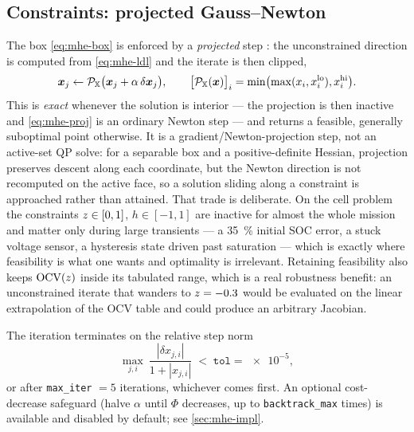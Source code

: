 \subsection{Constraints: projected Gauss--Newton}
The box \cref{eq:mhe-box} is enforced by a \emph{projected} step \citep{bertsekas1982projnewton}:
the unconstrained direction is computed from \cref{eq:mhe-ldl} and the iterate is then clipped,
\begin{equation}\label{eq:mhe-proj}
\bm{x}_j \leftarrow \mathcal{P}_{\mathbb{X}}\bigl(\bm{x}_j + \alpha\,\delta\bm{x}_j\bigr),
\qquad
\bigl[\mathcal{P}_{\mathbb{X}}(\bm{x})\bigr]_i = \min\bigl(\max(x_i, x^{\mathrm{lo}}_i), x^{\mathrm{hi}}_i\bigr).
\end{equation}
This is \emph{exact} whenever the solution is interior --- the projection is then inactive and
\cref{eq:mhe-proj} is an ordinary Newton step --- and returns a feasible, generally suboptimal point
otherwise.  It is a gradient/Newton-projection step, not an active-set QP solve: for a separable
box and a positive-definite Hessian, projection preserves descent along each coordinate, but the
Newton direction is not recomputed on the active face, so a solution sliding along a constraint is
approached rather than attained.  That trade is deliberate.  On the cell problem the constraints
$z\in[0,1]$, $h\in[-1,1]$ are inactive for almost the whole mission and matter only during large
transients --- a \SI{35}{\percent} initial SOC error, a stuck voltage sensor, a hysteresis state
driven past saturation --- which is exactly where feasibility is what one wants and optimality is
irrelevant.  Retaining feasibility also keeps $\mathrm{OCV}(z)$ inside its tabulated range, which is a
real robustness benefit: an unconstrained iterate that wanders to $z = -0.3$ would be evaluated
on the linear extrapolation of the OCV table and could produce an arbitrary Jacobian.

The iteration terminates on the relative step norm
\begin{equation}\label{eq:mhe-tol}
\max_{j,i}\ \frac{|\delta x_{j,i}|}{1+|x_{j,i}|} \;<\; \texttt{tol} = \num{e-5},
\end{equation}
or after \texttt{max\_iter} $= 5$ iterations, whichever comes first.  An optional cost-decrease
safeguard (halve $\alpha$ until $\Phi$ decreases, up to \texttt{backtrack\_max} times) is available
and disabled by default; see \cref{sec:mhe-impl}.


